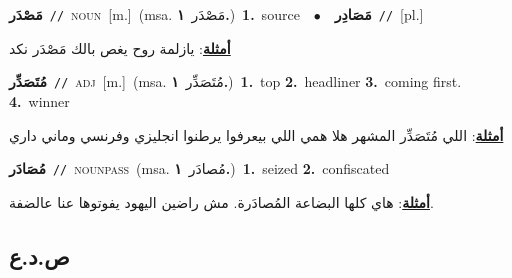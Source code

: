 \documentclass[10pt,a4paper,twoside]{article} %
\begin{document}
\begin{multicols}{2}
{\setlength\topsep{0pt}\textbf{\foreignlanguage{arabic}{مَصْدَر}}\ {\color{gray}\texttt{//}\color{black}}\ \textsc{noun}\ [m.]\ \color{gray}(msa. \foreignlanguage{arabic}{مَصْدَر}~\foreignlanguage{arabic}{\textbf{١.}})\color{black}\ \textbf{1.}~source\ \ $\bullet$\ \ \setlength\topsep{0pt}\textbf{\foreignlanguage{arabic}{مَصَادِر}}\ {\color{gray}\texttt{//}\color{black}}\ [pl.]\  \begin{flushright}\color{gray}\foreignlanguage{arabic}{\textbf{\underline{\foreignlanguage{arabic}{أمثلة}}}: يازلمة روح يغص بالك مَصْدَر نكد}\end{flushright}\color{black}} \vspace{2mm}

{\setlength\topsep{0pt}\textbf{\foreignlanguage{arabic}{مُتَصَدِّر}}\ {\color{gray}\texttt{//}\color{black}}\ \textsc{adj}\ [m.]\ \color{gray}(msa. \foreignlanguage{arabic}{مُتَصَدِّر}~\foreignlanguage{arabic}{\textbf{١.}})\color{black}\ \textbf{1.}~top  \textbf{2.}~headliner  \textbf{3.}~coming first.  \textbf{4.}~winner\  \begin{flushright}\color{gray}\foreignlanguage{arabic}{\textbf{\underline{\foreignlanguage{arabic}{أمثلة}}}: اللي مُتَصَدِّر المشهر هلا همي اللي بيعرفوا يرطنوا انجليزي وفرنسي وماني داري}\end{flushright}\color{black}} \vspace{2mm}

{\setlength\topsep{0pt}\textbf{\foreignlanguage{arabic}{مُصَادَر}}\ {\color{gray}\texttt{//}\color{black}}\ \textsc{noun\textunderscore pass}\ \color{gray}(msa. \foreignlanguage{arabic}{مُصادَر}~\foreignlanguage{arabic}{\textbf{١.}})\color{black}\ \textbf{1.}~seized  \textbf{2.}~confiscated\  \begin{flushright}\color{gray}\foreignlanguage{arabic}{\textbf{\underline{\foreignlanguage{arabic}{أمثلة}}}: هاي كلها البضاعة المُصادَرة. مش راضين اليهود يفوتوها عنا عالضفة.}\end{flushright}\color{black}} \vspace{2mm}

\vspace{-3mm}
\subsection*{\color{blue}\foreignlanguage{arabic}{ص.د.ع}\color{blue}{}} 


\end{multicols}
\end{document}
